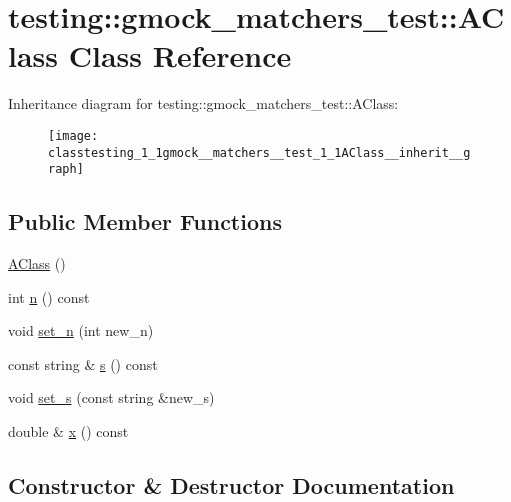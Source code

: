 \hypertarget{classtesting_1_1gmock__matchers__test_1_1AClass}{}\section{testing\+:\+:gmock\+\_\+matchers\+\_\+test\+:\+:A\+Class Class Reference}
\label{classtesting_1_1gmock__matchers__test_1_1AClass}


Inheritance diagram for testing\+:\+:gmock\+\_\+matchers\+\_\+test\+:\+:A\+Class\+:\nopagebreak
\begin{figure}[H]
\begin{center}
\leavevmode
\texttt{[image: classtesting\_1\_1gmock\_\_matchers\_\_test\_1\_1AClass\_\_inherit\_\_graph]}
\end{center}
\end{figure}
\subsection*{Public Member Functions}
\begin{DoxyCompactItemize}
\item 
\hyperlink{classtesting_1_1gmock__matchers__test_1_1AClass_ac43d717a80bb6fad8c77dc36f963ca88}{A\+Class} ()
\item 
int \hyperlink{classtesting_1_1gmock__matchers__test_1_1AClass_a6fb09c7c4d2314a2f9af9d07b31d02c1}{n} () const 
\item 
void \hyperlink{classtesting_1_1gmock__matchers__test_1_1AClass_a3181466cec6faa5ab3c6bc5c4dbf67b2}{set\+\_\+n} (int new\+\_\+n)
\item 
const string \& \hyperlink{classtesting_1_1gmock__matchers__test_1_1AClass_a4cbf37b13f0f9a2497ef8effc938d0f8}{s} () const 
\item 
void \hyperlink{classtesting_1_1gmock__matchers__test_1_1AClass_a131c5d2da4b5984f5af3fd84898eaf09}{set\+\_\+s} (const string \&new\+\_\+s)
\item 
double \& \hyperlink{classtesting_1_1gmock__matchers__test_1_1AClass_a4480f51cb8e304fc5551712a6507a1c9}{x} () const 
\end{DoxyCompactItemize}


\subsection{Constructor \& Destructor Documentation}
